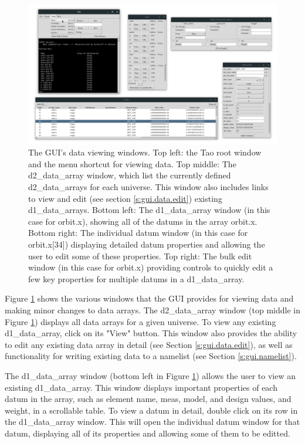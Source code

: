 \begin{figure}
\centering
\includegraphics[width=12cm]{figures/view_data.pdf}
\caption[The GUI's data viewing windows.]{The GUI's data viewing windows.
Top left: the Tao root window and the menu shortcut for viewing data.
Top middle: The d2_data_array window, which list the currently defined d2_data_arrays for each universe.
This window also includes links to view and edit (see section \ref{s:gui.data.edit}) existing d1_data_arrays.
Bottom left: The d1_data_array window (in this case for orbit.x), showing all of the datums in the array orbit.x.
Bottom right: The individual datum window (in this case for orbit.x[34]) displaying detailed datum properties and allowing the user to edit some of these properties.
Top right: The bulk edit window (in this case for orbit.x) providing controls to quickly edit a few key properties for multiple datums in a d1_data_array.}
\label{fig:gui.data.view}
\end{figure}

Figure \ref{fig:gui.data.view} shows the various windows that the GUI provides for viewing data and making minor changes to data arrays.
The d2_data_array window (top middle in Figure \ref{fig:gui.data.view}) displays all data arrays for a given universe.
To view any existing d1_data_array, click on its "View" button.
This window also provides the ability to edit any existing data array in detail (see Section \ref{s:gui.data.edit}), as well as functionality for writing existing data to a namelist (see Section \ref{s:gui.namelist}).

The d1_data_array window (bottom left in Figure \ref{fig:gui.data.view}) allows the user to view an existing d1_data_array.
This window displays important properties of each datum in the array, such as element name, meas, model, and design values, and weight, in a scrollable table.
To view a datum in detail, double click on its row in the d1_data_array window.
This will open the individual datum window for that datum, displaying all of its properties and allowing some of them to be editted.

